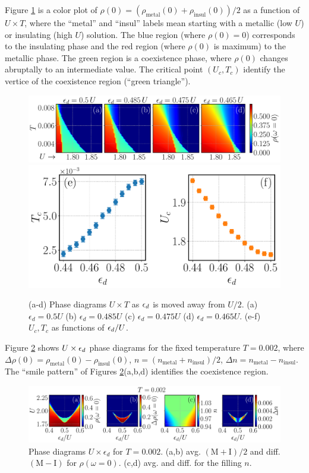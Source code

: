 \documentclass[12pt]{report}
\newcommand{\ALERT}[1]{\textcolor{red}{#1}}
\begin{document}
Figure \ref{fig:UxT-rho0} is a color plot of $\rho(0) = (\rho_{\text{metal}}(0) + \rho_{\text{insul}}(0))/2$ as a function of $U \times T$, where the ``metal'' and ``insul'' labels mean starting with a metallic (low $U$) or insulating (high $U$) solution. The blue region (where $\rho(0) = 0$) corresponds to the insulating phase and the red region (where $\rho(0)$ is maximum) to the metallic phase. The green region is a coexistence phase, where $\rho(0)$ changes abruptally to an intermediate value. The critical point $(U_c, T_c)$ identify the vertice of the coexistence region (``green triangle'').


\begin{figure}[H]
\centering
\includegraphics[width=0.8\columnwidth]{fig/fig2-abcd-eps-converted-to.pdf}
\includegraphics[width=0.48\columnwidth]{fig/fig2-ef-eps-converted-to.pdf}
\caption{(a-d) Phase diagrams $U \times T$ as $\epsilon_d$ is moved away from $U/2$. (a) $\epsilon_d=0.5U$ (b) $\epsilon_d=0.485U$ (c) $\epsilon_d=0.475U$ (d) $\epsilon_d=0.465U$. (e-f) $U_c, T_c$ as functions of $\epsilon_d/U$. }
\label{fig:UxT-rho0}
\end{figure}

Figure \ref{fig:T0002-butterfly} shows $U \times \epsilon_d$ phase diagrams for the fixed temperature $T = 0.002$, where $\Delta \rho(0) = \rho_{\text{metal}}(0) - \rho_{\text{insul}}(0)$, $n = (n_{\text{metal}} + n_{\text{insul}})/2$, $\Delta n = n_{\text{metal}} - n_{\text{insul}}$. The ``smile pattern'' of Figures \ref{fig:T0002-butterfly}(a,b,d) identifies the coexistence region.

\begin{figure}[H]
\centering
\includegraphics[width=\columnwidth]{fig/fig4-abcd-eps-converted-to.pdf}
\caption{Phase diagrams $U \times \epsilon_d$ for $T=0.002$. (a,b) avg. $(\text{M}+\text{I})/2$ and diff. $(\text{M}-\text{I})$ for $\rho(\omega=0)$. (c,d) avg. and diff. for the filling $n$. }
\label{fig:T0002-butterfly}
\end{figure}
\end{document}
